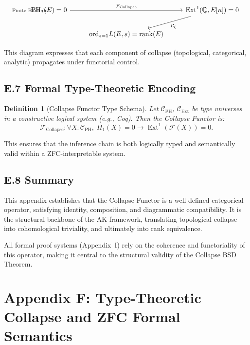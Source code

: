 \documentclass[11pt]{article}
\newtheorem{definition}[theorem]{Definition}
\DeclareMathOperator{\Ext}{Ext}
\DeclareMathOperator{\PH}{PH}
\newcommand{\QQ}{\mathbb{Q}}
\begin{document}
\[
\begin{tikzcd}
\PH_1(E) = 0 \arrow[rr, "\mathcal{F}_{\mathrm{Collapse}}"] \arrow[ "\text{Finite Barcode}"]
& & \Ext^1(\QQ,E[n]) = 0 \arrow[dl, "\mathcal{C}_\zeta"] \\
& \mathrm{ord}_{s=1} L(E,s) = \mathrm{rank}(E) &
\end{tikzcd}
\]

This diagram expresses that each component of collapse (topological, categorical, analytic) propagates under functorial control.

\subsection*{E.7 Formal Type-Theoretic Encoding}

\begin{definition}[Collapse Functor Type Schema]
Let $\mathcal{C}_{\mathrm{PH}}$, $\mathcal{C}_{\mathrm{Ext}}$ be type universes in a constructive logical system (e.g., Coq).  
Then the Collapse Functor is:
\[
\mathcal{F}_{\mathrm{Collapse}} : \forall X : \mathcal{C}_{\mathrm{PH}},\; H_1(X) = 0 \to \Ext^1(\mathcal{F}(X)) = 0.
\]
\end{definition}

This ensures that the inference chain is both logically typed and semantically valid within a ZFC-interpretable system.

\subsection*{E.8 Summary}

This appendix establishes that the Collapse Functor is a well-defined categorical operator, satisfying identity, composition, and diagrammatic compatibility.  
It is the structural backbone of the AK framework, translating topological collapse into cohomological triviality, and ultimately into rank equivalence.

All formal proof systems (Appendix~I) rely on the coherence and functoriality of this operator, making it central to the structural validity of the Collapse BSD Theorem.




\section*{Appendix F: Type-Theoretic Collapse and ZFC Formal Semantics}
\end{document}
